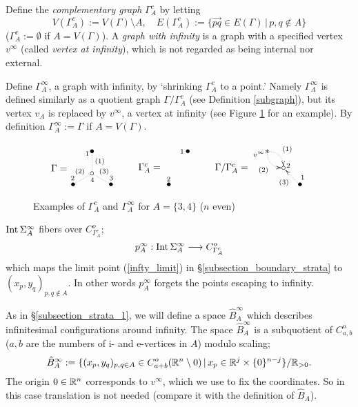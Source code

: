 \begin{defn}
Define the {\it complementary graph} $\Gamma^c_A$ by letting
\[
 V(\Gamma^c_A ) := V(\Gamma ) \setminus A, \quad
 E(\Gamma^c_A ) := \{ \overrightarrow{pq} \in E(\Gamma ) \, | \, p,q \not\in A \}
\]
($\Gamma^c_A :=\emptyset$ if $A=V(\Gamma )$).
A {\it graph with infinity} is a graph with a specified vertex $v^{\infty}$ (called {\it vertex at infinity}),
which is not regarded as being internal nor external.


Define $\Gamma^{\infty}_A$, a graph with infinity, by `shrinking $\Gamma^c_A$ to a point.'
Namely $\Gamma^{\infty}_A$ is defined similarly as a quotient graph $\Gamma / \Gamma^c_A$ (see Definition
\ref{subgraph}), but its vertex $v_A$ is replaced by $v^{\infty}$, a vertex at infinity (see Figure
\ref{fig_subgraph_infty} for an example).
By definition $\Gamma^{\infty}_A :=\Gamma$ if $A=V(\Gamma )$.
\end{defn}
\begin{figure}[htb]%
\[
 \begin{xy}
 (0,0)*{\circ}="O",(0,8)*{\bullet}="A",(-6.928,-4)*{\bullet}="B",(6.928,-4)*{\bullet}="C",
 {\ar@{.}"A";"O"_<{1}^(.45){(1)}},{\ar@{.}"B";"O"^<{2}^(.6){(2)}_>{4}},{\ar@{.}"C";"O"_<{3}_(.6){(3)}},(-12,2)*{\Gamma =},
 (35,8)*{\bullet},(33,8)*{\sb 1},(28.072,-4)*{\bullet},(28.072,-2)*{\sb 2},(21,2)*{\Gamma^c_A =},
 (70,2)*{\circ}="o",(64,8)*{*}="a",(76,-4)*{\bullet}="b",
 {\ar@{.>}@/^/"a";"o"^(.5){(1)}^>{2}}, {\ar@{.>}@/_/"a";"o"_<{v^{\infty}}_(.5){(2)}},{\ar@{.>}"b";"o"_<{1}^(.5){(3)}},
 (51,2)*{\Gamma /\Gamma^c_A =},
 \end{xy}
\]
\caption{Examples of $\Gamma^c_A$ and $\Gamma^{\infty}_A$ for $A= \{ 3,4\}$ ($n$ even)}\label{fig_subgraph_infty}
\end{figure}



$\mathrm{Int}\, \Sigma^{\infty}_A$ fibers over $C^o_{\Gamma^c_A}$;
\[
 p^{\infty}_A : \mathrm{Int}\, \Sigma^{\infty}_A \longrightarrow C^o_{\Gamma^c_A}
\]
which maps the limit point (\ref{infty_limit}) in \S \ref{subsection_boundary_strata} to $(x_p ,y_q )_{p,q \not\in A}$.
In other words $p^{\infty}_A$ forgets the points escaping to infinity.


As in \S \ref{subsection_strata_1}, we will define a space $\hat{B}^{\infty}_A$ which describes infinitesimal
configurations around infinity.
The space $\hat{B}^{\infty}_A$ is a subquotient of $C^o_{a,b}$ ($a,b$ are the numbers of i- and e-vertices in $A$)
modulo scaling;
\[
 \hat{B}^{\infty}_A :=
 \{ (x_p ,y_q )_{p,q\in A} \in C^o_{a+b}(\mathbb{R}^n \setminus 0) \, |\, x_p \in \mathbb{R}^j \times \{ 0\}^{n-j}\}/\mathbb{R}_{>0} .
\]
The origin $0 \in \mathbb{R}^n$ corresponds to $v^{\infty}$, which we use to fix the coordinates.
So in this case translation is not needed (compare it with the definition of $\hat{B}_A$).



